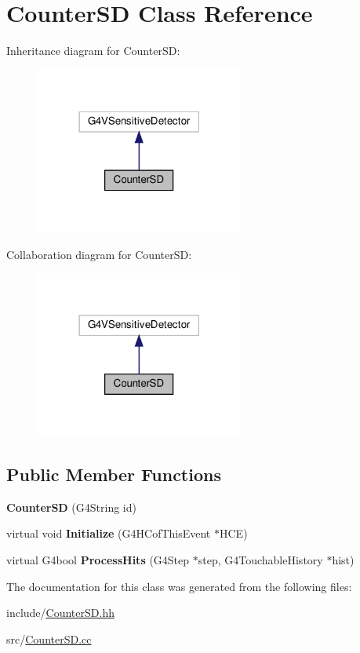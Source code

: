 \hypertarget{classCounterSD}{}\section{Counter\+SD Class Reference}
\label{classCounterSD}


Inheritance diagram for Counter\+SD\+:
\nopagebreak
\begin{figure}[H]
\begin{center}
\leavevmode
\includegraphics[width=194pt]{classCounterSD__inherit__graph}
\end{center}
\end{figure}


Collaboration diagram for Counter\+SD\+:
\nopagebreak
\begin{figure}[H]
\begin{center}
\leavevmode
\includegraphics[width=194pt]{classCounterSD__coll__graph}
\end{center}
\end{figure}
\subsection*{Public Member Functions}
\begin{DoxyCompactItemize}
\item 
\mbox{\label{classCounterSD_a47a5f480d0177da68a25ccde4ef26403}} 
{\bfseries Counter\+SD} (G4\+String id)
\item 
\mbox{\label{classCounterSD_acca87f1f1f5235ed58d46f8e216a82ff}} 
virtual void {\bfseries Initialize} (G4\+H\+Cof\+This\+Event $\ast$H\+CE)
\item 
\mbox{\label{classCounterSD_aeb540c654a6c5034d69835366d09ddb0}} 
virtual G4bool {\bfseries Process\+Hits} (G4\+Step $\ast$step, G4\+Touchable\+History $\ast$hist)
\end{DoxyCompactItemize}


The documentation for this class was generated from the following files\+:\begin{DoxyCompactItemize}
\item 
include/\hyperlink{CounterSD_8hh}{Counter\+S\+D.\+hh}\item 
src/\hyperlink{CounterSD_8cc}{Counter\+S\+D.\+cc}\end{DoxyCompactItemize}
